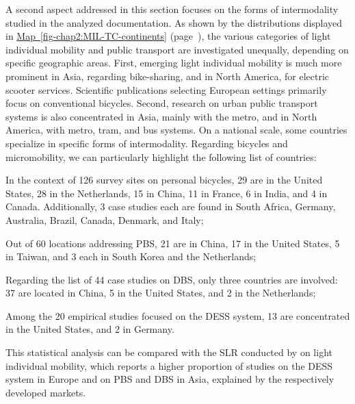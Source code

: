 \begin{refsegment}
A second aspect addressed in this section focuses on the forms of intermodality studied in the analyzed documentation. As shown by the distributions displayed in \hyperref[fig-chap2:MIL-TC-continents]{Map~\ref{fig-chap2:MIL-TC-continents}} (page~\pageref{fig-chap2:MIL-TC-continents}), the various categories of light individual mobility and public transport are investigated unequally, depending on specific geographic areas. First, emerging light individual mobility is much more prominent in Asia, regarding bike-sharing, and in North America, for electric scooter services. Scientific publications selecting European settings primarily focus on conventional bicycles. Second, research on urban public transport systems is also concentrated in Asia, mainly with the metro, and in North America, with metro, tram, and bus systems. On a national scale, some countries specialize in specific forms of intermodality. Regarding bicycles and micromobility, we can particularly highlight the following list of countries:
\begin{customitemize}
    \item In the context of 126 survey sites on personal bicycles, 29 are in the United States, 28 in the Netherlands, 15 in China, 11 in France, 6 in India, and 4 in Canada. Additionally, 3 case studies each are found in South Africa, Germany, Australia, Brazil, Canada, Denmark, and Italy;
    \item Out of 60 locations addressing \acrshort{PBS}, 21 are in China, 17 in the United States, 5 in Taiwan, and 3 each in South Korea and the Netherlands;
    \item Regarding the list of 44 case studies on \acrshort{DBS}, only three countries are involved: 37 are located in China, 5 in the United States, and 2 in the Netherlands;
    \item Among the 20 empirical studies focused on the \acrshort{DESS} system, 13 are concentrated in the United States, and 2 in Germany.
\end{customitemize}
This statistical analysis can be compared with the \acrshort{SLR} conducted by \textcolor{blue}{\textcite[298]{zhang_built_2023}} on light individual mobility, which reports a higher proportion of studies on the \acrshort{DESS} system in Europe and on \acrshort{PBS} and \acrshort{DBS} in Asia, explained by the respectively developed markets.%


\end{refsegment}
